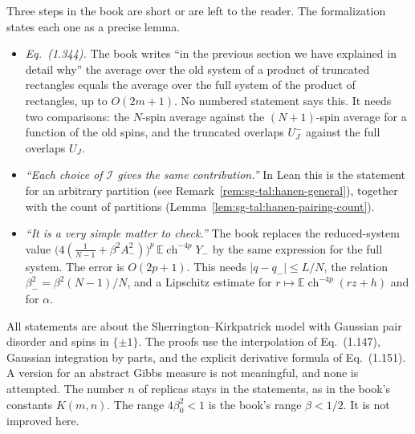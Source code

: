 \begin{remark}\label{rem:sg-tal:hanen-vague}
Three steps in the book are short or are left to the reader. The formalization states each one as a precise lemma.
\begin{itemize}
\item \emph{Eq.~(1.344).} The book writes ``in the previous section we have explained in detail why'' the average over the old system
 of a product of truncated rectangles equals the average over the full system of the product of rectangles, up to $O(2m+1)$.
 No numbered statement says this. It needs two comparisons: the $N$-spin average against the $(N+1)$-spin average
 for a function of the old spins, and the truncated overlaps $U_J^-$ against the full overlaps $U_J$.
\item \emph{``Each choice of $\mathcal I$ gives the same contribution.''} In Lean this is the statement for an arbitrary partition
 (see Remark~\ref{rem:sg-tal:hanen-general}), together with the count of partitions (Lemma~\ref{lem:sg-tal:hanen-pairing-count}).
\item \emph{``It is a very simple matter to check.''} The book replaces the reduced-system value
 $\bigl(4(\tfrac1{N-1}+\beta^2A_-^2)\bigr)^p\,\mathbb E\operatorname{ch}^{-4p}Y_-$ by the same expression for the full system. The error is $O(2p+1)$.
 This needs $|q-q_-|\le L/N$, the relation $\beta_-^2=\beta^2(N-1)/N$, and a Lipschitz estimate for
 $r\mapsto\mathbb E\operatorname{ch}^{-4p}(rz+h)$ and for $\alpha$.
\end{itemize}
\end{remark}

\begin{remark}\label{rem:sg-tal:hanen-limits}
All statements are about the Sherrington--Kirkpatrick model with Gaussian pair disorder and spins in $\{\pm1\}$.
The proofs use the interpolation of Eq.~(1.147), Gaussian integration by parts, and the explicit derivative formula of Eq.~(1.151).
A version for an abstract Gibbs measure is not meaningful, and none is attempted. The number $n$ of replicas stays in the statements,
as in the book's constants $K(m,n)$. The range $4\beta_0^2<1$ is the book's range $\beta<1/2$. It is not improved here.
\end{remark}

